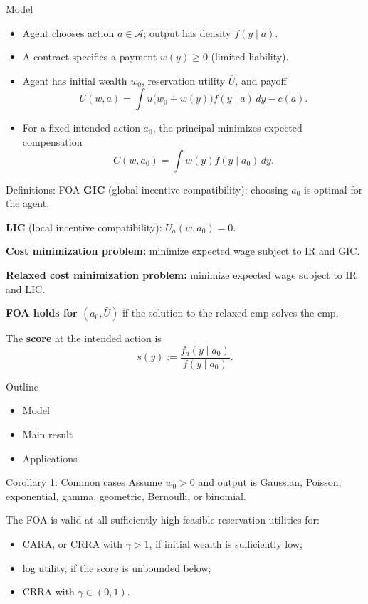 \documentclass[12pt,aspectratio=169,t]{beamer}
\begin{document}
\begin{frame}{Model}
  \begin{itemize}
    \item Agent chooses action $a\in\mathcal A$; output has density $f(y\mid a)$.
    \item A contract specifies a payment $w(y)\geq0$ (limited liability).
    \item Agent has initial wealth $w_0$, reservation utility $\bar U$, and payoff
    \[
      U(w,a)=\int u\bigl(w_0+w(y)\bigr)f(y\mid a)\,dy-c(a).
    \]
    \item For a fixed intended action $a_0$, the principal minimizes expected compensation
    \[
      C(w,a_0)=\int w(y)f(y\mid a_0)\,dy.
    \]
  \end{itemize}
\end{frame}

\begin{frame}{Definitions: FOA}
  \textbf{GIC} (global incentive compatibility): choosing $a_0$ is optimal for the agent.

  \textbf{LIC} (local incentive compatibility): $U_a(w, a_0) = 0$.

  \textbf{Cost minimization problem:} minimize expected wage subject to IR and GIC.

  \textbf{Relaxed cost minimization problem:} minimize expected wage subject to IR and LIC.

  \textbf{FOA holds for $(a_0, \bar{U})$} if the solution to the relaxed cmp solves the cmp.

  \medskip
  The \textbf{score} at the intended action is
  \[
    s(y):=\frac{f_a(y\mid a_0)}{f(y\mid a_0)}.
  \]
\end{frame}

\begin{frame}{Outline}
  \begin{itemize}
    \item Model
    \item \textcolor{alert}{Main result}
    \item Applications
  \end{itemize}
\end{frame}

\begin{frame}{Corollary 1: Common cases}
  Assume $w_0>0$ and output is Gaussian, Poisson, exponential, gamma, geometric, Bernoulli, or binomial.

  \medskip
  The FOA is valid at all sufficiently high feasible reservation utilities for:
  \begin{itemize}
    \item CARA, or CRRA with $\gamma>1$, if initial wealth is sufficiently low;
    \item log utility, if the score is unbounded below;
    \item CRRA with $\gamma\in(0,1)$.
  \end{itemize}
\end{frame}
\end{document}
